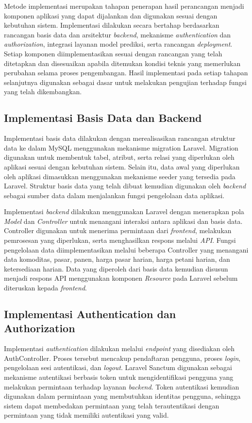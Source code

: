 Metode implementasi merupakan tahapan penerapan hasil perancangan menjadi komponen aplikasi yang dapat dijalankan dan digunakan sesuai dengan kebutuhan sistem. Implementasi dilakukan secara bertahap berdasarkan rancangan basis data dan arsitektur \textit{backend}, mekanisme \textit{authentication} dan \textit{authorization}, integrasi layanan model prediksi, serta rancangan \textit{deployment}. Setiap komponen diimplementasikan sesuai dengan rancangan yang telah ditetapkan dan disesuaikan apabila ditemukan kondisi teknis yang memerlukan perubahan selama proses pengembangan. Hasil implementasi pada setiap tahapan selanjutnya digunakan sebagai dasar untuk melakukan pengujian terhadap fungsi yang telah dikembangkan.

\subsection{Implementasi Basis Data dan Backend}

Implementasi basis data dilakukan dengan merealisasikan rancangan struktur data ke dalam MySQL menggunakan mekanisme migration Laravel. Migration digunakan untuk membentuk tabel, atribut, serta relasi yang diperlukan oleh aplikasi sesuai dengan kebutuhan sistem. Selain itu, data awal yang diperlukan oleh aplikasi dimasukkan menggunakan mekanisme seeder yang tersedia pada Laravel. Struktur basis data yang telah dibuat kemudian digunakan oleh \textit{backend} sebagai sumber data dalam menjalankan fungsi pengelolaan data aplikasi.

Implementasi \textit{backend} dilakukan menggunakan Laravel dengan menerapkan pola \textit{Model} dan \textit{Controller} untuk menangani interaksi antara aplikasi dan basis data. Controller digunakan untuk menerima permintaan dari \textit{frontend}, melakukan pemrosesan yang diperlukan, serta menghasilkan respons melalui \textit{API}. Fungsi pengelolaan data diimplementasikan melalui beberapa Controller yang menangani data komoditas, pasar, panen, harga pasar harian, harga petani harian, dan ketersediaan harian. Data yang diperoleh dari basis data kemudian disusun menjadi respons API menggunakan komponen \textit{Resource} pada Laravel sebelum diteruskan kepada \textit{frontend}.

\subsection{Implementasi Authentication dan Authorization}

Implementasi \textit{authentication} dilakukan melalui \textit{endpoint} yang disediakan oleh AuthController. Proses tersebut mencakup pendaftaran pengguna, proses \textit{login}, pengelolaan sesi autentikasi, dan \textit{logout}. Laravel Sanctum digunakan sebagai mekanisme autentikasi berbasis token untuk mengidentifikasi pengguna yang melakukan permintaan terhadap layanan \textit{backend}. Token autentikasi kemudian digunakan dalam permintaan yang membutuhkan identitas pengguna, sehingga sistem dapat membedakan permintaan yang telah terautentikasi dengan permintaan yang tidak memiliki autentikasi yang valid.

